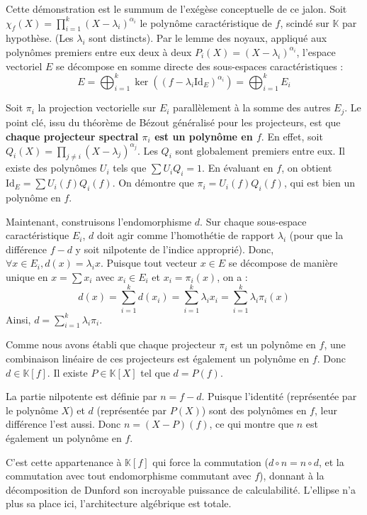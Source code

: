 \documentclass[11pt,a4paper]{article}
\begin{document}
Cette démonstration est le summum de l'exégèse conceptuelle de ce jalon.
Soit $\chi_f(X) = \prod_{i=1}^k (X - \lambda_i)^{\alpha_i}$ le polynôme caractéristique de $f$, scindé sur $\mathbb{K}$ par hypothèse. (Les $\lambda_i$ sont distincts).
Par le lemme des noyaux, appliqué aux polynômes premiers entre eux deux à deux $P_i(X) = (X - \lambda_i)^{\alpha_i}$, l'espace vectoriel $E$ se décompose en somme directe des sous-espaces caractéristiques :
$$ E = \bigoplus_{i=1}^k \ker((f - \lambda_i \text{Id}_E)^{\alpha_i}) = \bigoplus_{i=1}^k E_i $$

Soit $\pi_i$ la projection vectorielle sur $E_i$ parallèlement à la somme des autres $E_j$.
Le point clé, issu du théorème de Bézout généralisé pour les projecteurs, est que \textbf{chaque projecteur spectral $\pi_i$ est un polynôme en $f$}.
En effet, soit $Q_i(X) = \prod_{j \neq i} (X - \lambda_j)^{\alpha_j}$. Les $Q_i$ sont globalement premiers entre eux. Il existe des polynômes $U_i$ tels que $\sum U_i Q_i = 1$.
En évaluant en $f$, on obtient $\text{Id}_E = \sum U_i(f) Q_i(f)$. On démontre que $\pi_i = U_i(f) Q_i(f)$, qui est bien un polynôme en $f$.

Maintenant, construisons l'endomorphisme $d$.
Sur chaque sous-espace caractéristique $E_i$, $d$ doit agir comme l'homothétie de rapport $\lambda_i$ (pour que la différence $f-d$ y soit nilpotente de l'indice approprié).
Donc, $\forall x \in E_i, d(x) = \lambda_i x$.
Puisque tout vecteur $x \in E$ se décompose de manière unique en $x = \sum x_i$ avec $x_i \in E_i$ et $x_i = \pi_i(x)$, on a :
$$ d(x) = \sum_{i=1}^k d(x_i) = \sum_{i=1}^k \lambda_i x_i = \sum_{i=1}^k \lambda_i \pi_i(x) $$
Ainsi, $d = \sum_{i=1}^k \lambda_i \pi_i$.

Comme nous avons établi que chaque projecteur $\pi_i$ est un polynôme en $f$, une combinaison linéaire de ces projecteurs est également un polynôme en $f$.
Donc $d \in \mathbb{K}[f]$.
Il existe $P \in \mathbb{K}[X]$ tel que $d = P(f)$.

La partie nilpotente est définie par $n = f - d$.
Puisque l'identité (représentée par le polynôme $X$) et $d$ (représentée par $P(X)$) sont des polynômes en $f$, leur différence l'est aussi.
Donc $n = (X - P)(f)$, ce qui montre que $n$ est également un polynôme en $f$.

C'est cette appartenance à $\mathbb{K}[f]$ qui force la commutation ($d \circ n = n \circ d$, et la commutation avec tout endomorphisme commutant avec $f$), donnant à la décomposition de Dunford son incroyable puissance de calculabilité. L'ellipse n'a plus sa place ici, l'architecture algébrique est totale.
\end{document}
